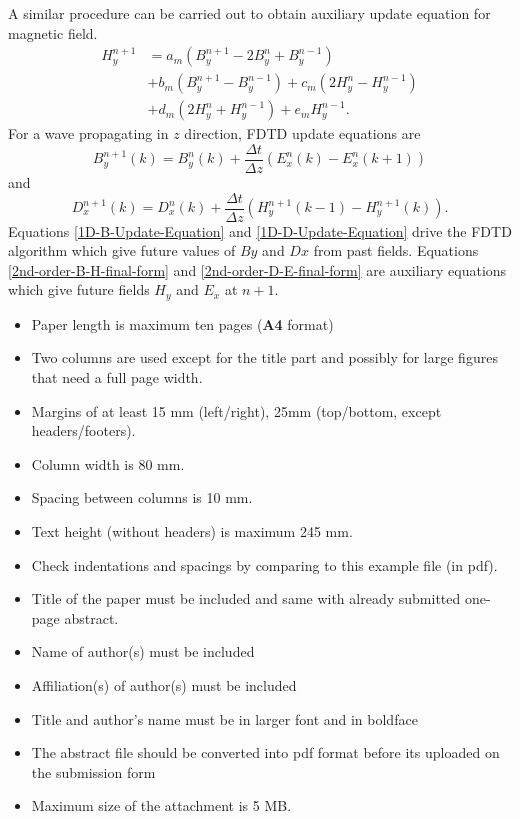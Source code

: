 \documentclass{article}
\begin{document}
A similar procedure can be carried out to obtain auxiliary update equation for magnetic field.
\begin{equation}
\begin{split}
H^{n+1}_y&=a_m\left(B^{n+1}_y-2B^n_y+B^{n-1}_y\right)\\&+b_m\left(B^{n+1}_y-B^{n-1}_y\right)
+c_m\left(2H^n_y-H^{n-1}_y\right)\\&+d_m\left(2H^n_y+H^{n-1}_y\right)+e_m H^{n-1}_y.
\end{split}
\label{2nd-order-B-H-final-form}
\end{equation}
For a wave propagating in $z$ direction, FDTD update equations are
\begin{equation}
B^{n+1}_y(k)=B^n_y(k)+\dfrac{\Delta t}{\Delta z}\left(E^n_x(k)-E^n_x(k+1)\right)
\label{1D-B-Update-Equation}
\end{equation}
and
\begin{equation}
D^{n+1}_x(k)=D^n_x(k)+\dfrac{\Delta t}{\Delta z}\left(H^{n+1}_y(k-1)-H^{n+1}_y(k)\right).
\label{1D-D-Update-Equation}
\end{equation}
Equations \ref{1D-B-Update-Equation} and \ref{1D-D-Update-Equation} drive the FDTD algorithm which give future values of $By$ and $Dx$ from past fields. Equations \ref{2nd-order-B-H-final-form} and \ref{2nd-order-D-E-final-form} are auxiliary equations which give future fields $H_y$ and $E_x$ at $n+1$.
\begin{itemize}
\setlength{\itemsep}{-1mm}
\item Paper length is maximum ten pages ({\bf A4} format)
\item Two columns are used except for the title part and possibly for large figures that need a full page width.
\item Margins of at least 15 mm (left/right), 25mm (top/bottom, except headers/footers).
\item Column width is 80 mm.
\item Spacing between columns is 10 mm.
\item Text height (without headers) is maximum 245 mm.
\item Check indentations and spacings by comparing to this example file (in pdf).
\item Title of the paper must be included and same with already submitted one-page abstract.
\item Name of author(s) must be included
\item Affiliation(s) of author(s) must be included
\item Title and author's name must be in larger font and in boldface
\item The abstract file should be converted into pdf format before its uploaded on the submission form
\item Maximum size of the attachment is 5 MB.
\end{itemize}
\end{document}
